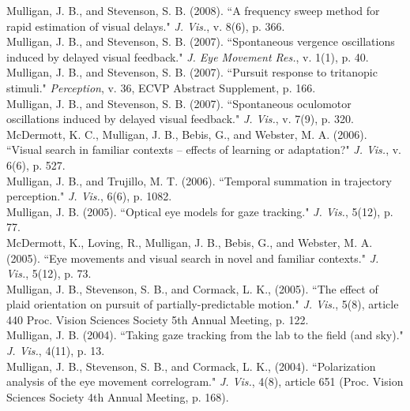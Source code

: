 \documentclass[12pt]{article}
\newcommand{\years}[1]{\marginnote{\scriptsize #1}}
\begin{document}
\years{2008}
Mulligan, J. B., and Stevenson, S. B. (2008).
``A frequency sweep method for rapid estimation of visual delays."
\emph{J. Vis.}, v. 8(6), p. 366.\\

\years{2007}
Mulligan, J. B., and Stevenson, S. B. (2007).
``Spontaneous vergence oscillations induced by delayed visual feedback."
\emph{J. Eye Movement Res.}, v. 1(1), p. 40.\\

Mulligan, J. B., and Stevenson, S. B. (2007).
``Pursuit response to tritanopic stimuli."
\emph{Perception}, v. 36, ECVP Abstract Supplement, p. 166.\\

Mulligan, J. B., and Stevenson, S. B. (2007).
``Spontaneous oculomotor oscillations induced by delayed visual feedback."
\emph{J. Vis.}, v. 7(9), p. 320.\\

\years{2006}
McDermott, K. C., Mulligan, J. B., Bebis, G., and Webster, M. A. (2006).
``Visual search in familiar contexts – effects of learning or adaptation?"
\emph{J. Vis.}, v. 6(6), p. 527.\\

Mulligan, J. B., and Trujillo, M. T. (2006).
``Temporal summation in trajectory perception."
\emph{J. Vis.}, 6(6), p. 1082.\\

\years{2005}
Mulligan, J. B. (2005).
``Optical eye models for gaze tracking."
\emph{J. Vis.}, 5(12), p. 77.\\

McDermott, K., Loving, R., Mulligan, J. B., Bebis, G., and Webster, M. A. (2005).
``Eye movements and visual search in novel and familiar contexts."
\emph{J. Vis.}, 5(12), p. 73.\\

\clearpage
Mulligan, J. B., Stevenson, S. B., and Cormack, L. K., (2005).
``The effect of plaid orientation on pursuit of partially-predictable motion."
\emph{J. Vis.}, 5(8), article 440
Proc. Vision Sciences Society 5th Annual Meeting, p. 122.\\

\years{2004}
Mulligan, J. B. (2004).
``Taking gaze tracking from the lab to the field (and sky)."
\emph{J. Vis.}, 4(11), p. 13.\\

Mulligan, J. B., Stevenson, S. B., and Cormack, L. K., (2004).
``Polarization analysis of the eye movement correlogram."
\emph{J. Vis.}, 4(8), article 651
(Proc. Vision Sciences Society 4th Annual Meeting, p. 168).\\
\end{document}
